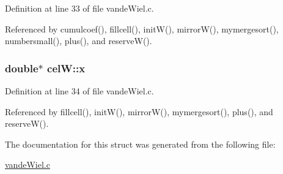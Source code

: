 Definition at line 33 of file vandeWiel.c.

Referenced by cumulcoef(), fillcell(), initW(), mirrorW(), mymergesort(), numbersmall(), plus(), and reserveW().\hypertarget{structcelW_b443b2a7120f170c2c5e8012f4dd86d7}{
\subsubsection{\setlength{\rightskip}{0pt plus 5cm}double$\ast$ {\bf celW::x}}}
\label{structcelW_b443b2a7120f170c2c5e8012f4dd86d7}




Definition at line 34 of file vandeWiel.c.

Referenced by fillcell(), initW(), mirrorW(), mymergesort(), plus(), and reserveW().

The documentation for this struct was generated from the following file:\begin{CompactItemize}
\item 
\hyperlink{vandeWiel_8c}{vandeWiel.c}\end{CompactItemize}
